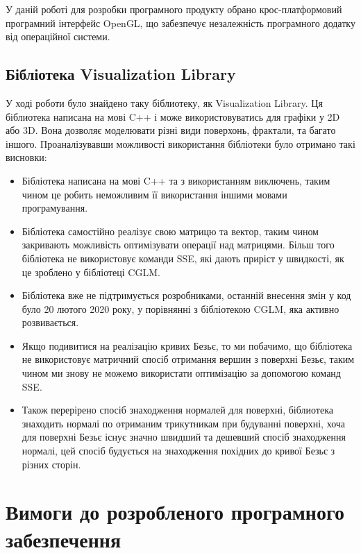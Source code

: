 \let\mypdfximage\pdfximage\def\pdfximage{\immediate\mypdfximage}\documentclass[14pt,a4paper]{extarticle}
\theoremstyle{definition}
\renewcommand{\[}{\begin{singlespace}\begin{equation*}}
\renewcommand{\]}{\end{equation*}\end{singlespace}}
\renewcommand{\+}{\discretionary{\mbox{\scriptsize$\hookleftarrow$}}{}{}}
\begin{document}
У даній роботі для розробки програмного продукту обрано крос-платформовий програмний інтерфейс OpenGL, що забезпечує незалежність програмного додатку від операційної системи.

\subsection{Бібліотека Visualization Library}

У ході роботи було знайдено таку біблиотеку, як Visualization Library. Ця біблиотека написана на мові C++ і може використовуватись для графіки у 2D або 3D. Вона дозволяє моделювати різні види поверхонь, фрактали, та багато іншого. Проаналізувавши можливості використання бібліотеки було отримано такі висновки:

\begin{itemize}
\item Бібліотека написана на мові C++ та з використанням виключень, таким чином це робить неможливим її використання іншими мовами програмування.
\item Бібліотека самостійно реалізує свою матрицю та вектор, таким чином закривають можливість оптимізувати операції над матрицями. Більш того бібліотека не  використовує команди SSE, які дають приріст у швидкості, як це зроблено у бібліотеці CGLM.
\item Бібліотека вже не підтримується розробниками, останній внесення змін у код було 20 лютого 2020 року, у порівнянні з бібліотекою CGLM, яка активно розвивається.
\item Якщо подивитися на реалізацію кривих Безьє, то ми побачимо, що бібліотека не використовує матричний спосіб отримання вершин з поверхні Безьє, таким чином ми знову не можемо використати оптимізацію за допомогою команд SSE.
\item Також перерірено спосіб знаходження нормалей для поверхні, біблиотека знаходить нормалі по отриманим трикутникам при будуванні поверхні, хоча для поверхні Безьє існує значно швидший та дешевший спосіб знаходження нормалі, цей спосіб будується на знаходження похідних до кривої Безьє з різних сторін.
\end{itemize}

\section{Вимоги до розробленого програмного забезпечення}
\end{document}

